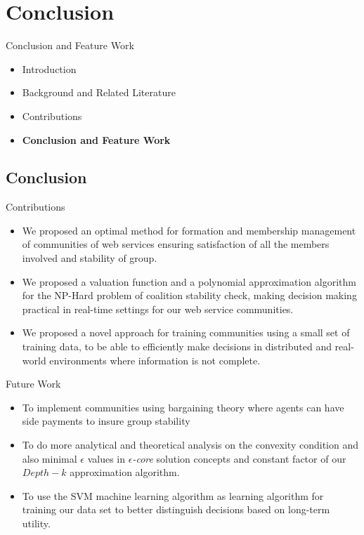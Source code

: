 \documentclass{beamer}
\begin{document}
\section{Conclusion}
\begin{frame}{Conclusion and Feature Work}
    \begin{itemize}
     	\itemsep=.5cm
        \item Introduction
        \item Background and Related Literature
    	\item Contributions
    	\item {\bf Conclusion and Feature Work}
    \end{itemize}
\end{frame}

\subsection{Conclusion}
\begin{frame}{Contributions}
    \begin{itemize}     	
        	\item We proposed an optimal method for formation and membership management of communities of web services ensuring satisfaction of all the members involved and stability of group.
        	\item We proposed a valuation function and a polynomial approximation algorithm for the NP-Hard problem of coalition stability check, making decision making practical in real-time settings for our web service communities.
        	\item We proposed a novel approach for training communities using a small set of training data, to be able to efficiently make decisions in distributed and real-world environments where information is not complete.
    \end{itemize}
\end{frame}

\begin{frame}{Future Work}
    \begin{itemize}     	
    	\item To implement communities using bargaining theory where agents can have side payments to insure group stability
    	\item To do more analytical and theoretical analysis on the convexity condition and also minimal $\epsilon$ values in \emph{$\epsilon$-core} solution concepts and constant factor  of our $Depth-k$ approximation algorithm.
    	\item To use the SVM machine learning algorithm as learning algorithm for training our data set to better distinguish decisions based on long-term utility.
    \end{itemize}
\end{frame}
\end{document}
